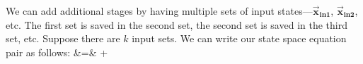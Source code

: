 We can add additional stages by having multiple sets of input
states---$\vec{\mathbf{x}}_{{\mathbf{in1}}}$,
$\vec{\mathbf{x}}_{{\mathbf{in2}}}$, etc. The first set is saved in
the second set, the second set is saved in the third set, etc.
Suppose there are $k$ input sets. We can write our state space
equation pair as follows: \starteqnstar {} &\hspace{-6pt}=\hspace{-6pt}&  
+ 
